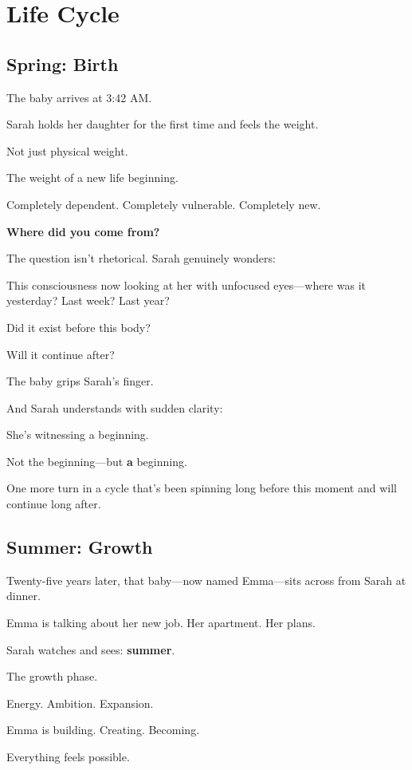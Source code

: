 \documentclass[11pt,twoside]{book}
\begin{document}
\chapter{Life Cycle}

\section*{Spring: Birth}

The baby arrives at 3:42 AM.

Sarah holds her daughter for the first time and feels the weight.

Not just physical weight.

The weight of a new life beginning.

Completely dependent. Completely vulnerable. Completely new.

\textbf{Where did you come from?}

The question isn't rhetorical. Sarah genuinely wonders:

This consciousness now looking at her with unfocused eyes—where was it yesterday? Last week? Last year?

Did it exist before this body?

Will it continue after?

The baby grips Sarah's finger.

And Sarah understands with sudden clarity:

She's witnessing a beginning.

Not the beginning—but \textbf{a} beginning.

One more turn in a cycle that's been spinning long before this moment and will continue long after.

\section*{Summer: Growth}

Twenty-five years later, that baby—now named Emma—sits across from Sarah at dinner.

Emma is talking about her new job. Her apartment. Her plans.

Sarah watches and sees: \textbf{summer}.

The growth phase.

Energy. Ambition. Expansion.

Emma is building. Creating. Becoming.

Everything feels possible.
\end{document}
